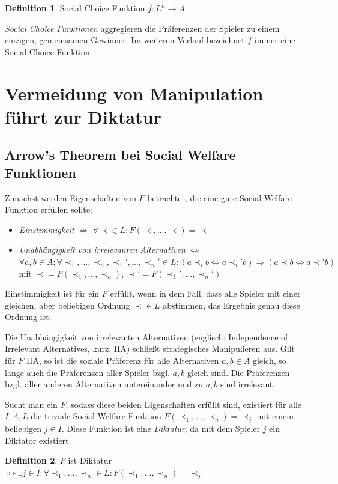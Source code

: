 \documentclass[a4paper,11pt]{article}
\theoremstyle{definition}
\newtheorem{definition}{Definition}
\theoremstyle{plain}
\theoremstyle{definition}
\begin{document}
\begin{definition}
	\label{def:socialchoicefunc}
	Social Choice Funktion $f : L^n \rightarrow A$
\end{definition}
\emph{Social Choice Funktionen} aggregieren die Präferenzen der Spieler zu einem einzigen, gemeinsamen Gewinner. Im weiteren Verlauf bezeichnet $f$ immer eine Social Choice Funktion.

\section{Vermeidung von Manipulation führt zur Diktatur}
\subsection{Arrow's Theorem bei Social Welfare Funktionen}
Zunächst werden Eigenschaften von $F$ betrachtet, die eine gute Social Welfare Funktion erfüllen sollte:
\begin{itemize}
	\item \emph{Einstimmigkeit} $\iff$ $\forall \prec \in L: F(\prec, \ldots,\prec) = \prec$
	\item \emph{Unabhängigkeit von irrelevanten Alternativen}
	$\iff$ $\forall a, b \in A; \forall \prec_1,\ldots,\prec_n, \prec_1', \ldots, \prec_n' \in L:	(a\prec_i b \iff a\prec_i' b) \Rightarrow (a\prec b \iff a\prec' b)$	mit $\prec = F(\prec_1, \ldots, \prec_n)$, $\prec' = F(\prec_1', \ldots, \prec_n')$
\end{itemize}

Einstimmigkeit ist für ein $F$ erfüllt, wenn in dem Fall, dass alle Spieler mit einer gleichen, aber beliebigen Ordnung $\prec \in L$ abstimmen, das Ergebnis genau diese Ordnung ist. 

Die Unabhängigkeit von irrelevanten Alternativen (englisch: Independence of Irrelevant Alternatives, kurz: IIA) schließt strategisches Manipulieren aus. Gilt für $F$ IIA, so ist die soziale Präferenz für alle Alternativen $a, b \in A$ gleich, so lange auch die Präferenzen aller Spieler bzgl. $a, b$ gleich sind. Die Präferenzen bzgl. aller anderen Alternativen untereinander und zu $a, b$ sind irrelevant.

Sucht man ein $F$, sodass diese beiden Eigenschaften erfüllt sind, existiert für alle $I, A, L$ die triviale Social Welfare Funktion $F(\prec_1, \ldots, \prec_n) = \prec_j$ mit einem beliebigen $j \in I$. Diese Funktion ist eine \emph{Diktatur}, da mit dem Spieler $j$ ein Diktator existiert. 

\begin{definition}
	\label{def:diktatur}
	$F$ ist Diktatur$\iff\exists j \in I: \forall \prec_1, \ldots, \prec_n \in L: F(\prec_1, \ldots, \prec_n) = \prec_j$
\end{definition}
\end{document}
